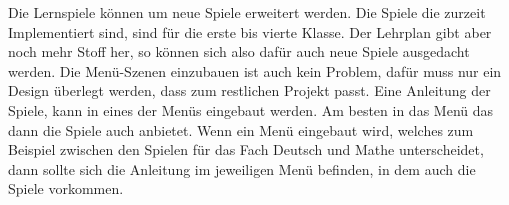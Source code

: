 Die Lernspiele können um neue Spiele erweitert werden. Die Spiele die zurzeit Implementiert sind, sind für die erste bis vierte Klasse. Der Lehrplan gibt aber noch mehr Stoff her, so können sich also dafür auch neue Spiele ausgedacht werden. Die Menü-Szenen einzubauen ist auch kein Problem, dafür muss nur ein Design überlegt werden, dass zum restlichen Projekt passt. Eine Anleitung der Spiele, kann in eines der Menüs eingebaut werden. Am besten in das Menü das dann die Spiele auch anbietet. Wenn ein Menü eingebaut wird, welches zum Beispiel zwischen den Spielen für das Fach Deutsch und Mathe unterscheidet, dann sollte sich die Anleitung im jeweiligen Menü befinden, in dem auch die Spiele vorkommen.\\

\appendix

\printbibliography[heading=bibintoc]



